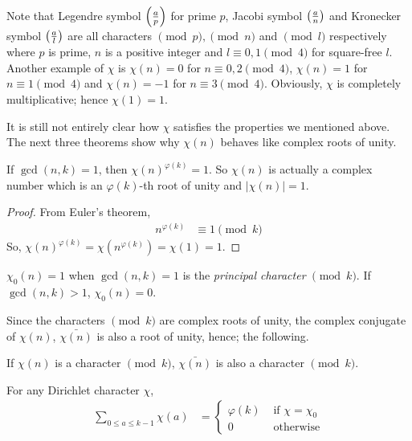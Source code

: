 \documentclass[elemannt.tex]{subfile}
\begin{document}
	Note that Legendre symbol $\qr{a}{p}$ for prime $p$, Jacobi symbol $\qr{a}{n}$ and Kronecker symbol $\qr{a}{l}$ are all characters $\pmod{p},\pmod{n}$ and $\pmod{l}$ respectively where $p$ is prime, $n$ is a positive integer and $l\equiv0,1\pmod{4}$ for square-free $l$. Another example of $\chi$ is $\chi(n)=0$ for $n\equiv0,2\pmod{4}$, $\chi(n)=1$ for $n\equiv1\pmod4$ and $\chi(n)=-1$ for $n\equiv3\pmod{4}$. Obviously, $\chi$ is completely multiplicative; hence $\chi(1)=1$.

	It is still not entirely clear how $\chi$ satisfies the properties we mentioned above. The next three theorems show why $\chi(n)$ behaves like complex roots of unity.
		\begin{theorem}
			If $\gcd(n,k)=1$, then $\chi(n)^{\varphi(k)}=1$. So $\chi(n)$ is actually a complex number which is an $\varphi(k)$-th root of unity and $|\chi(n)|=1$.
		\end{theorem}

		\begin{proof}
			From Euler's theorem,
				\begin{align*}
					n^{\varphi(k)}
						& \equiv1\pmod{k}
				\end{align*}
			So, $\chi(n)^{\varphi(k)}=\chi(n^{\varphi(k)})=\chi(1)=1$.
		\end{proof}

		\begin{definition}
			$\chi_{0}(n)=1$ when $\gcd(n,k)=1$ is the \textit{principal character} $\pmod{k}$. If $\gcd(n,k)>1$, $\chi_{0}(n)=0$.
		\end{definition}
	Since the characters $\pmod{k}$ are complex roots of unity, the complex conjugate of $\chi(n)$, $\bar{\chi(n)}$ is also a root of unity, hence; the following.
		\begin{theorem}
			If $\chi(n)$ is a character $\pmod{k}$, $\bar{\chi(n)}$ is also a character $\pmod{k}$.
		\end{theorem}

		\begin{theorem}\label{thm:sum-for-residues}
			For any Dirichlet character $\chi$,
				\begin{align*}
					\sum_{0\leq a\leq k-1}\chi(a)
						& =
							\begin{cases}
								\varphi(k)& \mbox{ if }\chi=\chi_{0}\\
								0& \mbox{ otherwise}
							\end{cases}
				\end{align*}

		\end{theorem}
\end{document}
